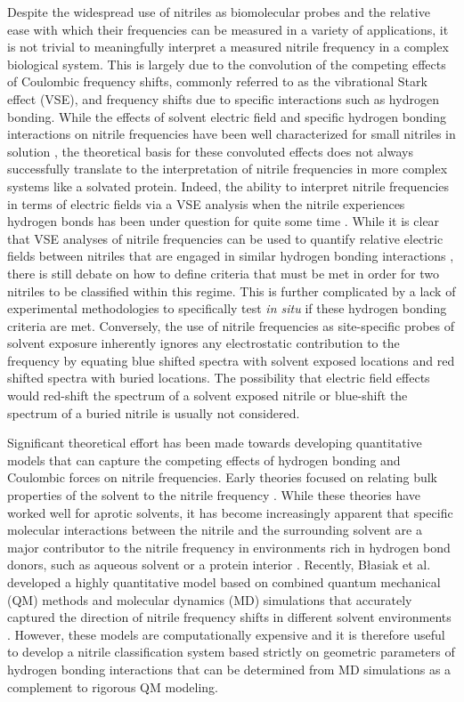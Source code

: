 Despite the widespread use of nitriles as biomolecular probes and the relative ease with which their frequencies can be measured in a variety of applications, it is not trivial to meaningfully interpret a measured nitrile frequency in a complex biological system.
This is largely due to the convolution of the competing effects of Coulombic frequency shifts, commonly referred to as the vibrational Stark effect (VSE), and frequency shifts due to specific interactions such as hydrogen bonding.
While the effects of solvent electric field and specific hydrogen bonding interactions on nitrile frequencies have been well characterized for small nitriles in solution \cite{Levinson2012, Blasiak2017, Deb2016}, the theoretical basis for these convoluted effects does not always successfully translate to the interpretation of nitrile frequencies in more complex systems like a solvated protein.
Indeed, the ability to interpret nitrile frequencies in terms of electric fields via a VSE analysis when the nitrile experiences hydrogen bonds has been under question for quite some time \cite{Slocum2016, Fafarman2010, Bagchi2012, Slocum2018}.
While it is clear that VSE analyses of nitrile frequencies can be used to quantify relative electric fields between nitriles that are engaged in similar hydrogen bonding interactions \cite{Slocum2016}, there is still debate on how to define criteria that must be met in order for two nitriles to be classified within this regime.
This is further complicated by a lack of experimental methodologies to specifically test \emph{in situ} if these hydrogen bonding criteria are met.
Conversely, the use of nitrile frequencies as site-specific probes of solvent exposure inherently ignores any electrostatic contribution to the frequency by equating blue shifted spectra with solvent exposed locations and red shifted spectra with buried locations.
The possibility that electric field effects would red-shift the spectrum of a solvent exposed nitrile or blue-shift the spectrum of a buried nitrile is usually not considered.

Significant theoretical effort has been made towards developing quantitative models that can capture the competing effects of hydrogen bonding and Coulombic forces on nitrile frequencies.
Early theories focused on relating bulk properties of the solvent to the nitrile frequency \cite{Kirkwood1934, Onsager1936}.
While these theories have worked well for aprotic solvents, it has become increasingly apparent that specific molecular interactions between the nitrile and the surrounding solvent are a major contributor to the nitrile frequency in environments rich in hydrogen bond donors, such as aqueous solvent or a protein interior \cite{Blasiak2017}.
Recently, B\l{}asiak et al. developed a highly quantitative model based on combined quantum mechanical (QM) methods and molecular dynamics (MD) simulations that accurately captured the direction of nitrile frequency shifts in different solvent environments \cite{Blasiak2016}.
However, these models are computationally expensive and it is therefore useful to develop a nitrile classification system based strictly on geometric parameters of hydrogen bonding interactions that can be determined from MD simulations as a complement to rigorous QM modeling.


